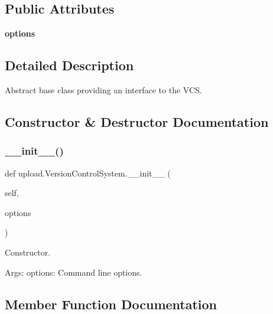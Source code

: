 \subsection*{Public Attributes}
\begin{DoxyCompactItemize}
\item 
\mbox{\label{classupload_1_1_version_control_system_a4d57d043bc408887b94269fe4cea9556}} 
{\bfseries options}
\end{DoxyCompactItemize}


\subsection{Detailed Description}
\begin{DoxyVerb}Abstract base class providing an interface to the VCS.\end{DoxyVerb}
 

\subsection{Constructor \& Destructor Documentation}
\mbox{\label{classupload_1_1_version_control_system_ace97e5785a2b40011404ae6fbb956ecf}} 
\subsubsection{\texorpdfstring{\+\_\+\+\_\+init\+\_\+\+\_\+()}{\_\_init\_\_()}}
{\footnotesize\ttfamily def upload.\+Version\+Control\+System.\+\_\+\+\_\+init\+\_\+\+\_\+ (\begin{DoxyParamCaption}\item[{}]{self,  }\item[{}]{options }\end{DoxyParamCaption})}

\begin{DoxyVerb}Constructor.

Args:
  options: Command line options.
\end{DoxyVerb}
 

\subsection{Member Function Documentation}
\mbox{\label{classupload_1_1_version_control_system_aa5eb260c96e7016dab36b5fc136c9f49}} 
